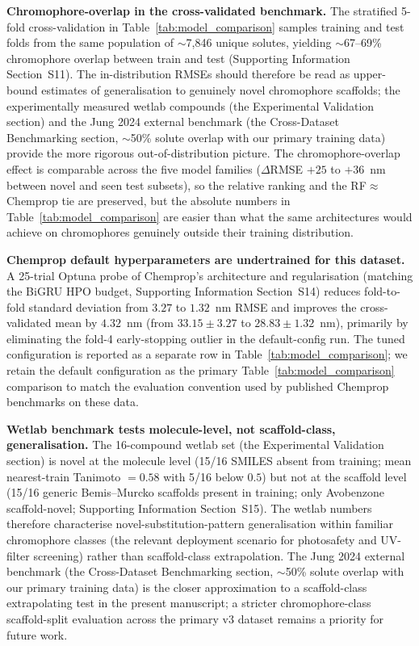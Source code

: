 \documentclass[journal=jcisd8,manuscript=article]{achemso}
\newcommand{\added}[1]{{\color{addedblue}#1}}
\begin{document}
\added{\textbf{Chromophore-overlap in the cross-validated benchmark.} The stratified 5-fold cross-validation in Table~\ref{tab:model_comparison} samples training and test folds from the same population of $\sim$7{,}846 unique solutes, yielding $\sim$67--69\% chromophore overlap between train and test (Supporting Information Section~S11). The in-distribution RMSEs should therefore be read as upper-bound estimates of generalisation to genuinely novel chromophore scaffolds; the experimentally measured wetlab compounds (the Experimental Validation section) and the Jung 2024 external benchmark (the Cross-Dataset Benchmarking section, $\sim$50\% solute overlap with our primary training data) provide the more rigorous out-of-distribution picture. The chromophore-overlap effect is comparable across the five model families ($\Delta$RMSE $+25$ to $+36$~nm between novel and seen test subsets), so the relative ranking and the RF$\approx$Chemprop tie are preserved, but the absolute numbers in Table~\ref{tab:model_comparison} are easier than what the same architectures would achieve on chromophores genuinely outside their training distribution.}

\added{\textbf{Chemprop default hyperparameters are undertrained for this dataset.} A 25-trial Optuna probe of Chemprop's architecture and regularisation (matching the BiGRU HPO budget, Supporting Information Section~S14) reduces fold-to-fold standard deviation from $3.27$ to $1.32$~nm RMSE and improves the cross-validated mean by $4.32$~nm (from $33.15 \pm 3.27$ to $28.83 \pm 1.32$~nm), primarily by eliminating the fold-4 early-stopping outlier in the default-config run. The tuned configuration is reported as a separate row in Table~\ref{tab:model_comparison}; we retain the default configuration as the primary Table~\ref{tab:model_comparison} comparison to match the evaluation convention used by published Chemprop benchmarks on these data.}

\added{\textbf{Wetlab benchmark tests molecule-level, not scaffold-class, generalisation.} The 16-compound wetlab set (the Experimental Validation section) is novel at the molecule level (15/16 SMILES absent from training; mean nearest-train Tanimoto $= 0.58$ with 5/16 below $0.5$) but not at the scaffold level (15/16 generic Bemis--Murcko scaffolds present in training; only Avobenzone scaffold-novel; Supporting Information Section~S15). The wetlab numbers therefore characterise novel-substitution-pattern generalisation within familiar chromophore classes (the relevant deployment scenario for photosafety and UV-filter screening) rather than scaffold-class extrapolation. The Jung 2024 external benchmark (the Cross-Dataset Benchmarking section, $\sim$50\% solute overlap with our primary training data) is the closer approximation to a scaffold-class extrapolating test in the present manuscript; a stricter chromophore-class scaffold-split evaluation across the primary v3 dataset remains a priority for future work.}
\end{document}
